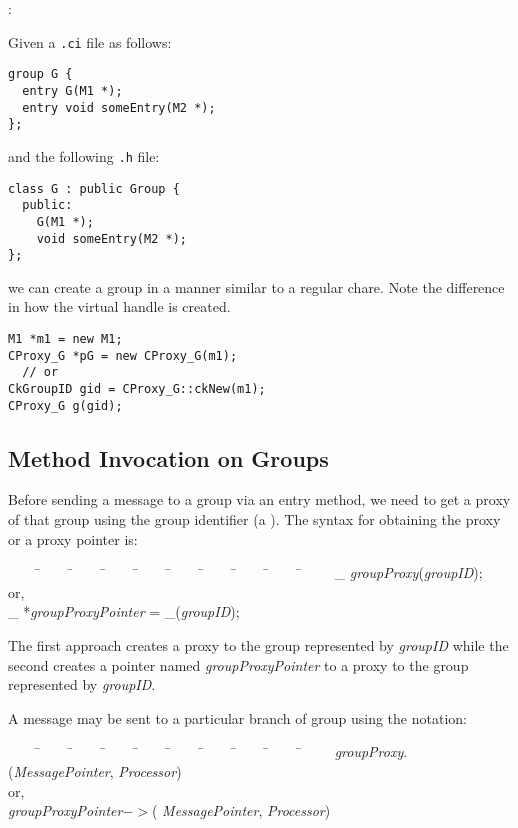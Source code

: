 :

\noindent Given a {\tt .ci} file as follows:

\begin{verbatim}
group G {
  entry G(M1 *);
  entry void someEntry(M2 *);
};
\end{verbatim}

\noindent and the following {\tt .h} file:

\begin{verbatim}
class G : public Group {
  public:
    G(M1 *);
    void someEntry(M2 *);
};
\end{verbatim}

we can create a group in a manner similar to a regular chare.  Note
the difference in how the virtual handle is created.

\begin{verbatim}
M1 *m1 = new M1;
CProxy_G *pG = new CProxy_G(m1);
  // or
CkGroupID gid = CProxy_G::ckNew(m1);
CProxy_G g(gid);
\end{verbatim}

\subsection{Method Invocation on Groups}

Before sending a message to a group via an entry
method, we need to get a proxy of that group using the group identifier (a
). The syntax for obtaining the proxy or a proxy
pointer is:

\begin{tabbing} ~~~~ \=~~~~ \=~~~~ \=~~~~ \=~~~~ \=~~~~ \=~~~~ \=~~~~ \=~~~~
\=~~~~ \kill \> \_ {\it groupProxy}({\it groupID}); \\
\> \> or, \\ \> \_ *{\it groupProxyPointer} = \_({\it groupID}); \end{tabbing}

The first approach creates a proxy to the group represented by {\it groupID}
while the second creates a pointer named {\it groupProxyPointer} to a proxy to
the group represented by {\it groupID}. 

A message may be sent to a particular branch of group using the
notation:

\begin{tabbing} ~~~~ \=~~~~ \=~~~~ \=~~~~ \=~~~~ \=~~~~ \=~~~~ \=~~~~ \=~~~~
\=~~~~ \kill \> {\it groupProxy}$.$({\it MessagePointer}, {\it
Processor}) \\ \> \> or, \\ \> {\it groupProxyPointer}$->$({\it
MessagePointer}, {\it Processor}) \end{tabbing}

